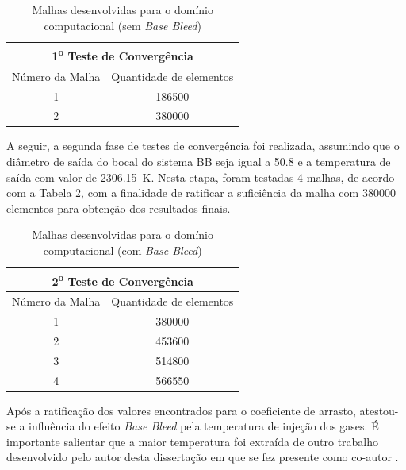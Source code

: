 \begin{table}[ht]
\centering
\caption[Malhas desenvolvidas para o domínio computacional (sem \textit{Base Bleed})]{Malhas desenvolvidas para o domínio computacional (sem \textit{Base Bleed})}
\vspace{0.5cm}
\begin{tabular}{c|c}
\multicolumn{2}{c}{1\textsuperscript{o} Teste de Convergência} \\
\hline 
Número da Malha & Quantidade de elementos \\ 
\hline
1 & \num{186500} \\
2 & \num{380000}
\end{tabular}
\label{tab:tabela-malhas-inicial}
\end{table}

A seguir, a segunda fase de testes de convergência foi realizada, assumindo que o diâmetro de saída do bocal do sistema BB seja igual a \qty{50,8}{\millimetre} e a temperatura de saída com valor de \qty{2306,15}{\kelvin}. Nesta etapa, foram testadas 4 malhas, de acordo com a Tabela \ref{tab:tabela-malhas-secundaria}, com a finalidade de ratificar a suficiência da malha com \num{380000} elementos para obtenção dos resultados finais.

\begin{table}[ht]
\centering
\caption[Malhas desenvolvidas para o domínio computacional (com \textit{Base Bleed})]{Malhas desenvolvidas para o domínio computacional (com \textit{Base Bleed})}
\vspace{0.5cm}
\begin{tabular}{c|c}
\multicolumn{2}{c}{2\textsuperscript{o} Teste de Convergência} \\
\hline 
Número da Malha & Quantidade de elementos \\ 
\hline
1 & \num{380000} \\
2 & \num{453600} \\
3 & \num{514800} \\
4 & \num{566550}
\end{tabular}
\label{tab:tabela-malhas-secundaria}
\end{table}

Após a ratificação dos valores encontrados para o coeficiente de arrasto, atestou-se a influência do efeito \textit{Base Bleed} pela temperatura de injeção dos gases. É importante salientar que a maior temperatura foi extraída de outro trabalho desenvolvido pelo autor desta dissertação em que se fez presente como co-autor \cite{Gil2020}.

